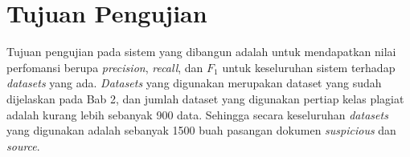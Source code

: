 \documentclass[../Book.tex]{subfiles}
\begin{document}
\section{Tujuan Pengujian}
Tujuan pengujian pada sistem yang dibangun adalah untuk mendapatkan nilai perfomansi berupa \textit{precision}, \textit{recall}, dan $F_{1}$ untuk keseluruhan sistem terhadap \textit{datasets} yang ada. \textit{Datasets} yang digunakan merupakan dataset yang sudah dijelaskan pada Bab 2, dan jumlah dataset yang digunakan pertiap kelas plagiat adalah kurang lebih sebanyak 900 data. Sehingga secara keseluruhan \textit{datasets} yang digunakan adalah sebanyak 1500 buah pasangan dokumen \textit{suspicious} dan \textit{source}.
\end{document}
